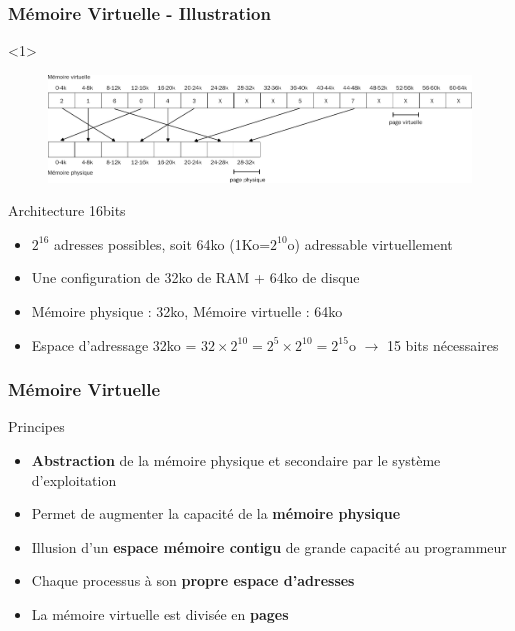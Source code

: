 \documentclass[8pt]{beamer}
\begin{document}
\begin{frame}[c]
    \frametitle{Mémoire Virtuelle - Illustration}
    \begin{onlyenv}<1>
        \vspace*{1.25cm}
        \begin{figure}
            \centering

            \includegraphics[height=.25\textwidth]{figures/memoire_virtuelle_physique.pdf}
        \end{figure}
    \end{onlyenv}
    \begin{exampleblock}{Architecture 16bits}
        \begin{itemize}
            \item  $2^{16}$ adresses possibles, soit 64ko
                  (1Ko=$2^{10}$o) adressable virtuellement
            \item Une configuration de 32ko de RAM + 64ko de disque
            \item M\'emoire physique : 32ko, M\'emoire virtuelle : 64ko
            \item Espace d'adressage 32ko = $32 \times 2^{10} = 2^5
                      \times2^{10} = 2^{15}$o $\to$ 15 bits n\'ecessaires
        \end{itemize}
    \end{exampleblock}
\end{frame}

\begin{frame}
    \frametitle{Mémoire Virtuelle}
    \begin{block}{Principes}
        \begin{itemize}
            \item \textbf{Abstraction} de la mémoire physique et secondaire par
                  le système d'exploitation
            \item Permet de \fg{} augmenter la capacité de la
                  \textbf{mémoire physique}
            \item Illusion d’un \textbf{espace mémoire
                      contigu} de grande capacité au programmeur
            \item Chaque processus \`a son \textbf{propre espace
                      d'adresses}
            \item La mémoire virtuelle est divisée en \textbf{pages}
        \end{itemize}
    \end{block}
\end{frame}
\end{document}
